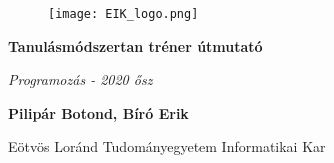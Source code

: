 \documentclass[../Main.tex]{subfiles}
\begin{document}
\begin{titlepage}
	
	\begin{figure}[t]
        \texttt{[image: EIK\_logo.png]}
    \end{figure}
	\begin{center}
		\vspace*{6\baselineskip}
	
		
		{\Huge \textbf{Tanulásmódszertan tréner útmutató\\}}
		
		\large{\textit{Programozás - 2020 ősz}}\\
		
        \vspace*{1,5\baselineskip}

        \begin{center}
        \large{\textbf{Pilipár Botond, Bíró Erik}}\\
        \end{center}
		
		\vspace{1,5\baselineskip}
		
		
		\vspace{1,5\baselineskip}
		\large{Eötvös Loránd Tudományegyetem Informatikai Kar}\\

	\end{center}
	
    \vspace*{15\baselineskip}
	
\end{titlepage}
\end{document}

